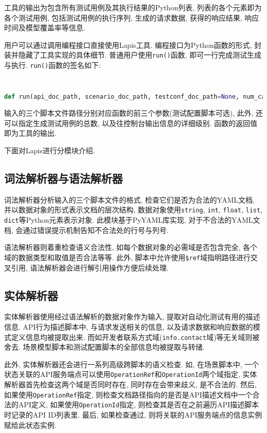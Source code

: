 	    工具的输出为包含所有测试用例及其执行结果的Python列表, 列表的各个元素即为各个测试用例, 包括测试用例的执行序列, 生成的请求数据, 获得的响应结果, 响应时间及模型覆盖率等信息.
	    
	    \label{sec:program_interface}
	    用户可以通过调用编程接口直接使用Lapis工具. 编程接口为Python函数的形式, 封装并隐藏了工具实现的具体细节. 普通用户使用\texttt{run()}函数, 即可一行完成测试生成与执行. \texttt{run()}函数的签名如下:
        \begin{flushleft}
            \scriptsize
            \tt
            \begin{lstlisting}[language=python]
def run(api_doc_path, scenario_doc_path, testconf_doc_path=None, num_case=1, verbose=0)
            \end{lstlisting}
        \end{flushleft}
        输入的三个脚本文件路径分别对应函数的前三个参数(测试配置脚本可选), 此外, 还可以指定生成测试用例的总数, 以及往控制台输出信息的详细级别. 函数的返回值即为工具的输出.
        
        下面对Lapis进行分模块介绍.

	    \subsection{词法解析器与语法解析器}
	        词法解析器分析输入的三个脚本文件的格式, 检查它们是否为合法的YAML文档, 并以数据对象的形式表示文档的层次结构, 数据对象使用\texttt{string}, \texttt{int}, \texttt{float}, \texttt{list}, \texttt{dict}等Python元素表示对象. 此模块基于PyYAML库实现, 对于不合法的YAML文档, 会通过错误提示机制告知不合法处的行号与列号.
	        
	        语法解析器则着重检查语义合法性, 如每个数据对象的必需域是否包含完全, 各个域的数据类型和取值是否合法等等. 此外, 脚本中允许使用\texttt{\$ref}域指明路径进行交叉引用, 语法解析器会进行解引用操作方便后续处理.
	    
	    \subsection{实体解析器}
	        实体解析器使用经过语法解析的数据对象作为输入, 提取对自动化测试有用的描述信息. API行为描述脚本中, 与请求发送相关的信息, 以及请求数据和响应数据的模式定义信息均被提取出来. 而如开发者联系方式域(\texttt{info.contact}域)等无关域则被舍去. 场景模型脚本和测试配置脚本的全部信息均被提取与转储.
	        
	        此外, 实体解析器还会进行一系列高级跨脚本的语义检查. 如, 在场景脚本中, 一个状态关联的API服务端点可以使用\texttt{OperationRef}和\texttt{OperationId}两个域指定, 实体解析器首先检查这两个域是否同时存在, 同时存在会带来歧义, 是不合法的. 然后, 如果使用\texttt{OperationRef}指定, 则检查文档路径指向的是否是API描述文档中一个合法的API定义, 如果使用\texttt{OperationId}指定, 则检查其是否在之前遍历API描述脚本时记录的API ID列表里. 最后, 如果检查通过, 则将关联的API服务端点的信息实例赋给此状态实例.
	        
